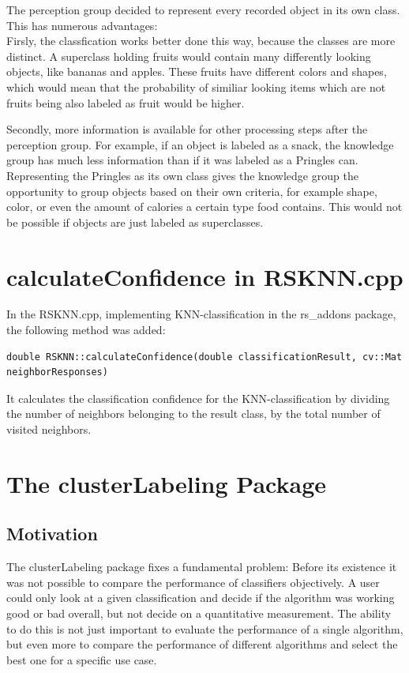 \documentclass[main.tex]{subfiles}
\begin{document}
The perception group decided to represent every recorded object in its own class. This has numerous advantages:\\

Firsly, the classfication works better done this way, because the classes are more distinct. A superclass holding fruits would contain many differently looking objects, like bananas and apples. These fruits have different colors and shapes, which would mean that the probability of similiar looking items which are not fruits being also labeled as fruit would be higher.

Secondly, more information is available for other processing steps after the perception group. For example, if an object is labeled as a snack, the knowledge group has much less information than if it was labeled as a Pringles can. Representing the Pringles as its own class gives the knowledge group the opportunity to group objects based on their own criteria, for example shape, color, or even the amount of calories a certain type food contains. This would not be possible if objects are just labeled as superclasses.
 



\section{calculateConfidence in RSKNN.cpp}\label{KNN confidence}
In the RSKNN.cpp, implementing KNN-classification in the rs\_addons package, the following method was added:

\begin{lstlisting}
double RSKNN::calculateConfidence(double classificationResult, cv::Mat neighborResponses)
\end{lstlisting}

It calculates the classification confidence for the KNN-classification by dividing the number of neighbors belonging to the result class, by the total number of visited neighbors. 

\section{The clusterLabeling Package}\label{clusterLabeling}
\subsection{Motivation}
The clusterLabeling package fixes a fundamental problem: Before its existence it was not possible to compare the performance of classifiers objectively. A user could only look at a given classification and decide if the algorithm was working good or bad overall, but not decide on a quantitative measurement. The ability to do this is not just important to evaluate the performance of a single algorithm, but even more to compare the performance of different algorithms and select the best one for a specific use case.\\
\end{document}
